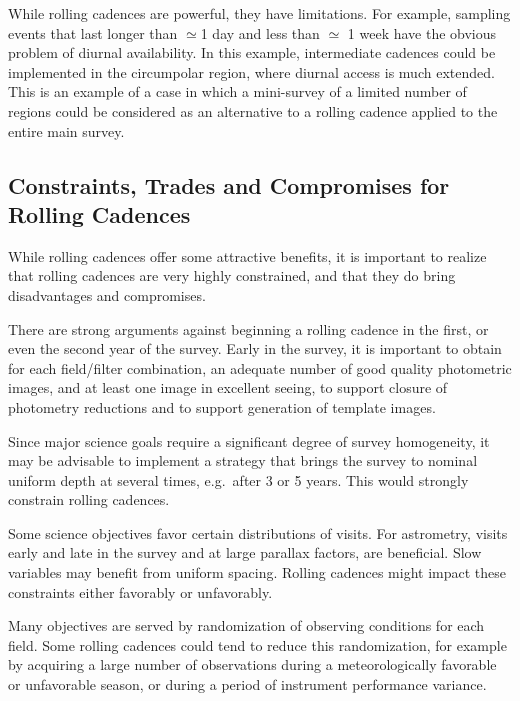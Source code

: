 While rolling cadences are powerful, they have limitations.  For example, sampling events that last longer than $\simeq$1 day and less than $\simeq$ 1 week have the obvious problem of diurnal availability.  In this example, intermediate cadences could be implemented in the circumpolar region, where diurnal access is much extended.  This is an example of a case in which a mini-survey of a limited number of regions could be considered as an alternative to a rolling cadence applied to the entire main survey.


\subsection{Constraints, Trades and Compromises for Rolling Cadences}
\label{sec:rolling:trades}

While rolling cadences offer some attractive benefits, it is important to realize that rolling cadences are very highly constrained, and that they do bring disadvantages and compromises.

There are strong arguments against beginning a rolling cadence in the first, or even the second year of the survey.  Early in the survey, it is important to obtain for each field/filter combination, an adequate number of good quality photometric images, and at least one image in excellent seeing, to support closure of photometry reductions and to support generation of template images.

Since major science goals require a significant degree of survey homogeneity,
it may be advisable to implement a strategy that brings the survey to nominal
uniform depth at several times, e.g.\ after 3 or 5 years.  This would strongly
constrain rolling cadences.

Some science objectives favor certain distributions of visits.  For astrometry, visits early and late in the survey and at large parallax factors, are beneficial.  Slow variables may benefit from uniform spacing.  Rolling cadences might impact these constraints either favorably or unfavorably.

Many objectives are served by randomization of observing conditions for each field.  Some rolling cadences could tend to reduce this randomization, for example by acquiring a large number of observations during a meteorologically favorable or unfavorable season, or during a period of instrument performance variance.

